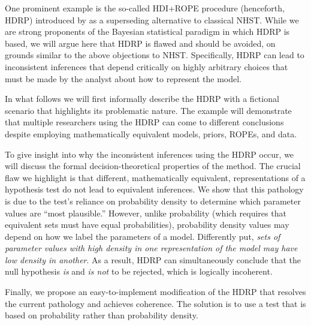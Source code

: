 \documentclass[man]{apa}
\newcommand{\hdr}{HDRP}
\begin{document}

One prominent example is the so-called HDI+ROPE procedure (henceforth, \hdr{}) introduced by  as a superseding alternative to classical NHST.  
While we are strong proponents of the Bayesian statistical paradigm \cite{EtzSI,Vandekerckhove2018} in which \hdr{} is based, we will argue here that \hdr{} is flawed and should be avoided, on grounds similar to the above objections to NHST.  Specifically, \hdr{} can lead to inconsistent inferences that depend critically on highly arbitrary choices that must be made by the analyst about how to represent the model. 

In what follows we will first informally describe the \hdr{} with a fictional scenario that highlights its problematic nature. The example will demonstrate that multiple researchers using the \hdr{} can come to different conclusions despite employing mathematically equivalent models, priors, ROPEs, and data. %

To give insight into why the inconsistent inferences using the \hdr{} occur, we will discuss the formal decision-theoretical properties of the method. The crucial flaw we highlight is that different, mathematically equivalent, representations of a hypothesis test do not lead to equivalent inferences. We show that this pathology is due to the test's reliance on probability density to determine which parameter values are ``most plausible.'' However, unlike probability (which requires that equivalent sets must have equal probabilities), probability density values may depend on how we label the parameters of a model.  Differently put, \textit{sets of parameter values with high density in one representation of the model may have low density in another}. As a result, \hdr{} can simultaneously conclude that the null hypothesis \textit{is} and \textit{is not} to be rejected, which is logically incoherent.

Finally, we propose an easy-to-implement modification of the \hdr{} that resolves the current pathology and achieves coherence. The solution is to use a test that is based on probability rather than probability density. 
\end{document}
